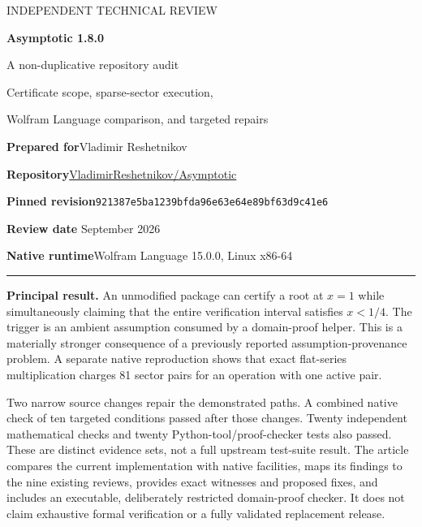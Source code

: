 \documentclass[11pt,a4paper]{article}
\begin{document}
\begin{titlepage}
\thispagestyle{empty}
\vspace*{12mm}
{\sffamily\large\color{accent}INDEPENDENT TECHNICAL REVIEW\par}
\vspace{10mm}
{\sffamily\bfseries\fontsize{30}{35}\selectfont\color{ink}Asymptotic 1.8.0\par}
\vspace{5mm}
{\sffamily\LARGE A non-duplicative repository audit\par}
\vspace{5mm}
{\large Certificate scope, sparse-sector execution,\par Wolfram Language comparison, and targeted repairs\par}
\vspace{13mm}
\textbf{Prepared for}\quad Vladimir Reshetnikov\par
\textbf{Repository}\quad\href{https://github.com/VladimirReshetnikov/Asymptotic}{VladimirReshetnikov/Asymptotic}\par
\textbf{Pinned revision}\quad\nolinkurl{921387e5ba1239bfda96e63e64e89bf63d9c41e6}\par
\textbf{Review date} September 2026\par
\textbf{Native runtime}\quad Wolfram Language 15.0.0, Linux x86-64\par
\vspace{9mm}\hrule\vspace{5mm}
\textbf{Principal result.} An unmodified package can certify a root at $x=1$ while simultaneously claiming that the entire verification interval satisfies $x<1/4$. The trigger is an ambient assumption consumed by a domain-proof helper. This is a materially stronger consequence of a previously reported assumption-provenance problem. A separate native reproduction shows that exact flat-series multiplication charges 81 sector pairs for an operation with one active pair.

Two narrow source changes repair the demonstrated paths. A combined native check of ten targeted conditions passed after those changes. Twenty independent mathematical checks and twenty Python-tool/proof-checker tests also passed. These are distinct evidence sets, not a full upstream test-suite result.
\vfill
\small The article compares the current implementation with native facilities, maps its findings to the nine existing reviews, provides exact witnesses and proposed fixes, and includes an executable, deliberately restricted domain-proof checker. It does not claim exhaustive formal verification or a fully validated replacement release.
\end{titlepage}
\begingroup\footnotesize\setlength{\parskip}{0pt}\setlength{\baselineskip}{10pt}\tableofcontents\endgroup
\clearpage
\end{document}
